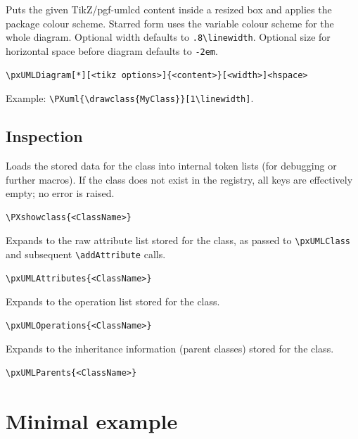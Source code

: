\documentclass[11pt,a4paper]{article}
\begin{document}
\DescribeMacro{\pxUMLDiagram}
Puts the given TikZ/pgf-umlcd content inside a resized box and applies the
package colour scheme. Starred form uses the variable colour scheme for the
whole diagram. Optional width defaults to \texttt{.8\textbackslash linewidth}.
Optional size for horizontal space before diagram defaults to \texttt{-2em}.
\begin{verbatim}
\pxUMLDiagram[*][<tikz options>]{<content>}[<width>]<hspace>
\end{verbatim}
Example: \texttt{\textbackslash PXuml\{\textbackslash drawclass\{MyClass\}\}[1\textbackslash linewidth]}.

\subsection{Inspection}

\DescribeMacro{\PXshowclass}
Loads the stored data for the class into internal token lists (for debugging or
further macros). If the class does not exist in the registry, all keys are
effectively empty; no error is raised.
\begin{verbatim}
\PXshowclass{<ClassName>}
\end{verbatim}

\DescribeMacro{\pxUMLAttributes}
Expands to the raw attribute list stored for the class, as passed to
\verb|\pxUMLClass| and subsequent \verb|\addAttribute| calls.
\begin{verbatim}
\pxUMLAttributes{<ClassName>}
\end{verbatim}

\DescribeMacro{\pxUMLOperations}
Expands to the operation list stored for the class.
\begin{verbatim}
\pxUMLOperations{<ClassName>}
\end{verbatim}

\DescribeMacro{\pxUMLParents}
Expands to the inheritance information (parent classes) stored for the class.
\begin{verbatim}
\pxUMLParents{<ClassName>}
\end{verbatim}

\section{Minimal example}
\label{sec:example}
\end{document}
